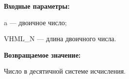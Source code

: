 \textbf{Входные параметры:}
 
 a --- двоичное число;
 
 VHML\_N --- длина двоичного числа.
 
\textbf{Возвращаемое значение:}

 Число в десятичной системе исчисления.